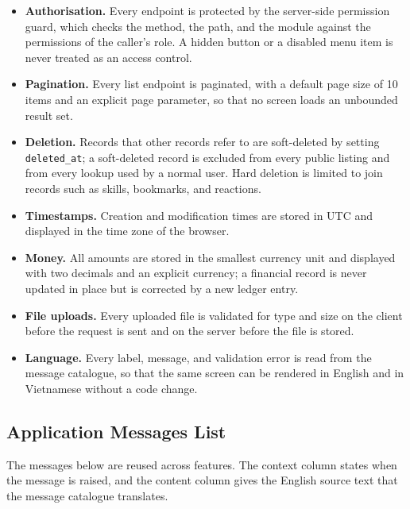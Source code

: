 \begin{itemize}
    \item \textbf{Authorisation.} Every endpoint is protected by the server-side permission guard, which checks the method, the path, and the module against the permissions of the caller's role. A hidden button or a disabled menu item is never treated as an access control.
    \item \textbf{Pagination.} Every list endpoint is paginated, with a default page size of 10 items and an explicit page parameter, so that no screen loads an unbounded result set.
    \item \textbf{Deletion.} Records that other records refer to are soft-deleted by setting \texttt{deleted\_at}; a soft-deleted record is excluded from every public listing and from every lookup used by a normal user. Hard deletion is limited to join records such as skills, bookmarks, and reactions.
    \item \textbf{Timestamps.} Creation and modification times are stored in UTC and displayed in the time zone of the browser.
    \item \textbf{Money.} All amounts are stored in the smallest currency unit and displayed with two decimals and an explicit currency; a financial record is never updated in place but is corrected by a new ledger entry.
    \item \textbf{File uploads.} Every uploaded file is validated for type and size on the client before the request is sent and on the server before the file is stored.
    \item \textbf{Language.} Every label, message, and validation error is read from the message catalogue, so that the same screen can be rendered in English and in Vietnamese without a code change.
\end{itemize}

\subsection{Application Messages List}

The messages below are reused across features. The context column states when the message is raised, and the content column gives the English source text that the message catalogue translates.

\begingroup
\small
\setlength{\tabcolsep}{4pt}
\renewcommand{\arraystretch}{1.3}

